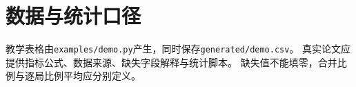 \section{数据与统计口径}
教学表格由\texttt{examples/demo.py}产生，同时保存\texttt{generated/demo.csv}。
真实论文应提供指标公式、数据来源、缺失字段解释与统计脚本。
缺失值不能填零，合并比例与逐局比例平均应分别定义。
